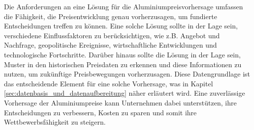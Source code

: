 Die Anforderungen an eine Lösung für die Aluminiumpreisvorhersage umfassen die Fähigkeit, die Preisentwicklung genau vorherzusagen, um fundierte Entscheidungen treffen zu können. Eine solche Lösung sollte in der Lage sein, verschiedene Einflussfaktoren zu berücksichtigen, wie z.B. Angebot und Nachfrage, geopolitische Ereignisse, wirtschaftliche Entwicklungen und technologische Fortschritte. Darüber hinaus sollte die Lösung in der Lage sein, Muster in den historischen Preisdaten zu erkennen und diese Informationen zu nutzen, um zukünftige Preisbewegungen vorherzusagen. Diese Datengrundlage ist das entscheidende Element für eine solche Vorhersage, was in Kapitel \ref{sec:datenbasis_und_datenaufbereitung} näher erläutert wird. Eine zuverlässige Vorhersage der Aluminiumpreise kann Unternehmen dabei unterstützen, ihre Entscheidungen zu verbessern, Kosten zu sparen und somit ihre Wettbewerbsfähigkeit zu steigern.


